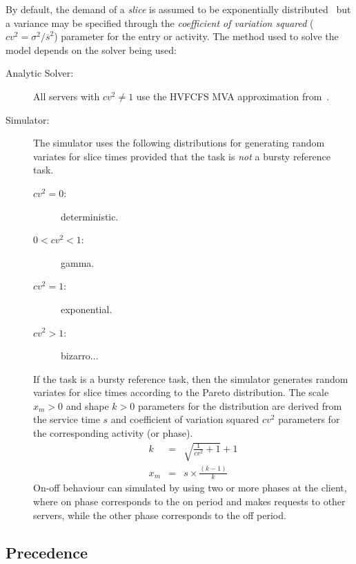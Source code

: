 By default, the demand of a \emph{slice} is assumed to be exponentially distributed~\cite{srvn:woodside-94-ieeetc-srvn}
but a variance may be specified through the \emph{coefficient of
  variation squared} ($\textit{cv}^2 = \sigma^2 / \overline{s}^2$) parameter for the entry or activity.  The
method used to solve the model depends on the solver being used:
\begin{description}
\item[Analytic Solver:] All servers with $\textit{cv}^2 \ne 1$ use the HVFCFS MVA approximation
  from~\cite{queue:reiser-79}.  
\item[Simulator:] The simulator uses the following distributions for generating random variates for slice
  times provided that the task is \emph{not} a bursty reference task.
  \begin{description}
  \item[$\textit{cv}^2 = 0$:] deterministic.
  \item[$0 < \textit{cv}^2 < 1$:] gamma.
  \item[$\textit{cv}^2 = 1$:] exponential.
  \item[$\textit{cv}^2 > 1$:] bizarro...
  \end{description}
  If the task is a bursty reference task, then the simulator generates random
  variates for slice times according to the Pareto distribution. The scale $x_m >
  0$ and shape $k > 0$ parameters for the distribution are derived from the service time $s$ and coefficient
  of variation squared $\textit{cv}^2$ parameters for the corresponding activity (or phase).
  \begin{eqnarray*}
    k & = & \sqrt{\frac{1}{\textit{cv}^2} + 1} + 1 \\
    x_m & = & s \times \frac{(k - 1)}{k}
  \end{eqnarray*}
  On-off behaviour can simulated by using two or more phases at the client, where on
  phase corresponds to the on period and makes requests to other servers, while the other phase corresponds
  to the off period.
\end{description}

\subsection{Precedence}
\label{sec:precedence}

